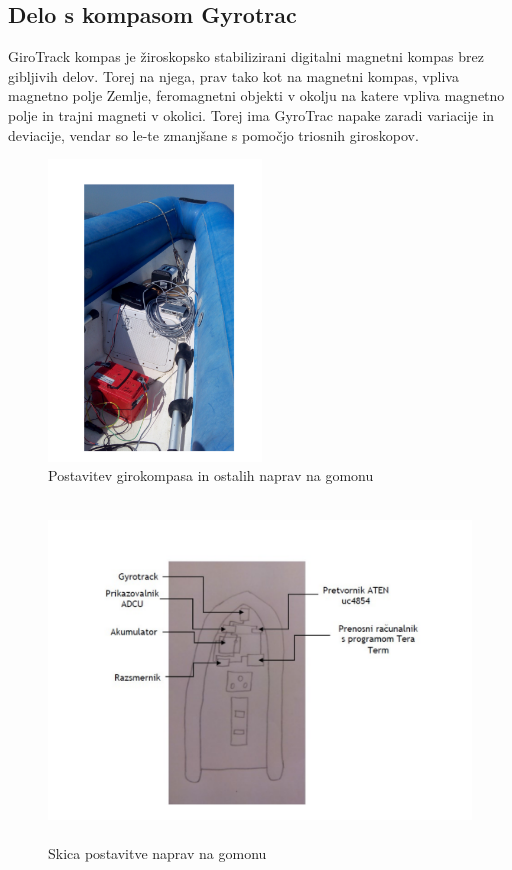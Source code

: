\subsection{Delo s kompasom Gyrotrac}
GiroTrack kompas je žiroskopsko stabilizirani digitalni magnetni kompas brez gibljivih delov. Torej na njega, prav tako kot na magnetni kompas, vpliva magnetno polje Zemlje, feromagnetni objekti v okolju na katere vpliva magnetno polje in trajni magneti v okolici. Torej ima GyroTrac napake zaradi variacije in deviacije, vendar so le-te zmanjšane s pomočjo triosnih giroskopov.

\begin{figure}
	\centering
	\includegraphics[height=8cm]{Postavitev_gumenjak}
	\caption{Postavitev girokompasa in ostalih naprav na gomonu}
	\label{fig:GT_gum}       %
\end{figure}

\begin{figure}
	\centering
	\includegraphics[height=9cm]{Razporeditev_opreme}
	\caption{Skica postavitve naprav na gomonu}
	\label{fig:gum_tloris}       %
\end{figure}


